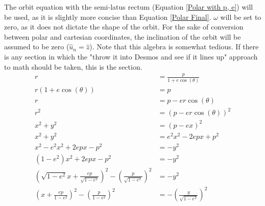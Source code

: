 \documentclass{article}
\begin{document}
The orbit equation with the semi-latus rectum (Equation \eqref{Polar with p, e}) will be used, as it is slightly more concise than Equation \eqref{Polar Final}. $\omega$ will be set to zero, as it does not dictate the shape of the orbit. For the sake of conversion between polar and cartesian coordinates, the inclination of the orbit will be assumed to be zero ($\hat{u}_n=\hat{z}$). Note that this algebra is somewhat tedious. If there is any section in which the "throw it into Desmos and see if it lines up" approach to math should be taken, this is the section.
\begin{align*}
    r                                                                                          & =\frac{p}{1+e\cos(\theta)}                                      \\
    r(1+e\cos(\theta))                                                                         & = p                                                             \\
    r                                                                                          & =p-er\cos(\theta)                                               \\
    r^2                                                                                        & =(p-er\cos(\theta))^2                                           \\
    x^2+y^2                                                                                    & =(p-ex)^2                                                       \\
    x^2+y^2                                                                                    & =e^2x^2-2epx+p^2                                                \\
    x^2-e^2x^2+2epx-p^2                                                                        & =-y^2                                                           \\
    (1-e^2)x^2+2epx-p^2                                                                        & =-y^2                                                           \\
    \left(\sqrt{1-e^2}x+\frac{ep}{\sqrt{1-e^2}}\right)^2-\left(\frac{p}{\sqrt{1-e^2}}\right)^2 & =-y^2                                                           \\
    \left(x+\frac{ep}{1-e^2}\right)^2-\left(\frac{p}{1-e^2}\right)^2                           & =-\left(\frac{y}{\sqrt{1-e^2}}\right)^2                         \\

\end{align*}
\end{document}

